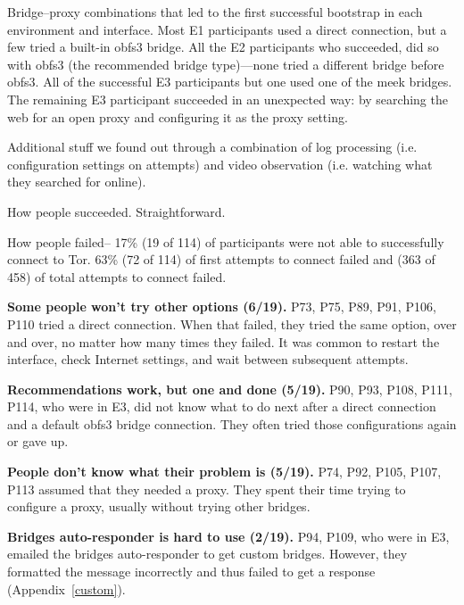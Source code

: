 \documentclass[USenglish,oneside,twocolumn]{article}
\begin{document}
{\begin{table}
\centering

\caption{
Bridge--proxy combinations that led to the first successful bootstrap
in each environment and interface.
Most E1 participants used a direct connection,
but a few tried a built-in obfs3 bridge.
All the E2 participants who succeeded,
did so with obfs3 (the recommended bridge type)---none tried
a different bridge before obfs3.
All of the successful E3 participants but one
used one of the meek bridges.
The remaining E3 participant succeeded in an unexpected way:
by searching the web for an open proxy and configuring it
as the proxy setting.
}
\label{tab:attempts-bridge-proxy}
\end{table}

{\color {red} 
Additional stuff we found out through a combination of log processing (i.e. configuration settings on attempts) and video observation (i.e. watching what they searched for online).

How people succeeded. Straightforward. 

How people failed-- 17\% (19 of 114) of participants were not able to successfully connect to Tor. 63\% (72 of 114) of first attempts to connect failed and (363 of 458) of total attempts to connect failed. \\ 

\begin{description}
\item {\bfseries Some people won't try other options (6/19).} P73, P75, P89, P91, P106, P110 tried a direct connection. When that failed, they tried the same option, over and over, no matter how many times they failed. It was common to restart the interface, check Internet settings, and wait between subsequent attempts.

\item {\bfseries Recommendations work, but one and done (5/19).} P90, P93, P108, P111, P114, who were in E3, did not know what to do next after a direct connection and a default obfs3 bridge connection. They often tried those configurations again or gave up. 

\item {\bfseries People don't know what their problem is (5/19).} P74, P92, P105, P107, P113 assumed that they needed a proxy. They spent their time trying to configure a proxy, usually without trying other bridges. 

\item {\bfseries Bridges auto-responder is hard to use (2/19).} P94, P109, who were in E3, emailed the bridges auto-responder to get custom bridges. However, they formatted the message incorrectly and thus failed to get a response (Appendix~\ref{custom}).
\end{description}
} 

}
\end{document}
